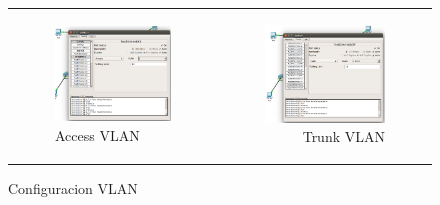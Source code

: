 \documentclass[spanish]{udpreport}
\begin{document}
\begin{figure}[H]
\begin{tabular}{ l  r }
	\begin{subfigure}{0.5\textwidth}
		\label{fig:Figura 2.4.1}
		\includegraphics[width=0.9\linewidth]{imagenes/A4_1e.png}
		\caption{Access VLAN}
	\end{subfigure}
	&
	\begin{subfigure}{0.5\textwidth}
		\label{fig:Figura 2.4.2}
		\includegraphics[width=0.9\linewidth]{imagenes/A4_2e.png}
		\caption{Trunk VLAN}
	\end{subfigure}
\end{tabular}
\caption{Configuracion VLAN}
\label{fig:Figura 2.4}
\end{figure}
\end{document}
